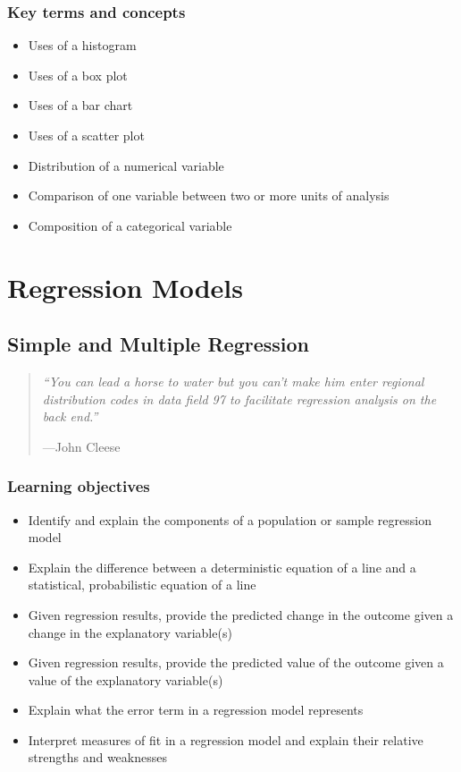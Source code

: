 \documentclass[
]{book}
\providecommand{\tightlist}{%
  \setlength{\itemsep}{0pt}\setlength{\parskip}{0pt}}
\begin{document}
\hypertarget{kt5}{%
\section{Key terms and concepts}\label{kt5}}

\begin{itemize}
\tightlist
\item
  Uses of a histogram
\item
  Uses of a box plot
\item
  Uses of a bar chart
\item
  Uses of a scatter plot
\item
  Distribution of a numerical variable
\item
  Comparison of one variable between two or more units of analysis
\item
  Composition of a categorical variable
\end{itemize}

\hypertarget{part-regression-models}{%
\part{Regression Models}\label{part-regression-models}}

\hypertarget{simple-and-multiple-regression}{%
\chapter{Simple and Multiple Regression}\label{simple-and-multiple-regression}}

\begin{quote}
\emph{``You can lead a horse to water but you can't make him enter regional distribution codes in data field 97 to facilitate regression analysis on the back end.''}

---John Cleese
\end{quote}

\hypertarget{lo6}{%
\section{Learning objectives}\label{lo6}}

\begin{itemize}
\tightlist
\item
  Identify and explain the components of a population or sample regression model
\item
  Explain the difference between a deterministic equation of a line and a statistical, probabilistic equation of a line
\item
  Given regression results, provide the predicted change in the outcome given a change in the explanatory variable(s)
\item
  Given regression results, provide the predicted value of the outcome given a value of the explanatory variable(s)
\item
  Explain what the error term in a regression model represents
\item
  Interpret measures of fit in a regression model and explain their relative strengths and weaknesses
\end{itemize}
\end{document}
